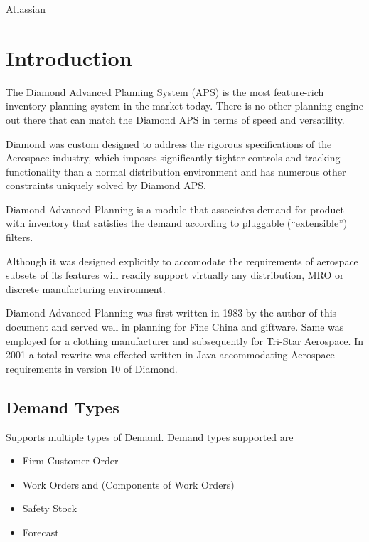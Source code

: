\documentclass[letterpaper,10pt,english]{sphinxmanual}
\begin{document}
\href{http://www.atlassian.com/}{Atlassian}


\chapter{Introduction}
\label{APS/Introduction:introduction}\label{APS/Introduction::doc}
The Diamond Advanced Planning System (APS) is the most feature-rich
inventory planning system in the market today. There is no other
planning engine out there that can match the Diamond APS in terms of
speed and versatility.

Diamond was custom designed to address the rigorous specifications of
the Aerospace industry, which imposes significantly tighter controls and
tracking functionality than a normal distribution environment and has numerous
other constraints uniquely solved by Diamond APS.

Diamond Advanced Planning is a module that associates demand for product
with inventory that satisfies the demand according to pluggable
(“extensible”) filters.

Although it was designed explicitly to accomodate the requirements of
aerospace subsets of its features will readily support virtually any
distribution, MRO or discrete manufacturing environment.

Diamond Advanced Planning was first written in 1983 by the author of
this document and served well in planning for Fine China and giftware.
Same was employed for a clothing manufacturer and subsequently for
Tri-Star Aerospace. In 2001 a total rewrite was effected written in Java
accommodating Aerospace requirements in version 10 of Diamond.


\section{Demand Types}
\label{APS/Introduction:demand-types}
Supports multiple types of Demand. Demand types supported are
\begin{itemize}
\item {} 
Firm Customer Order

\item {} 
Work Orders and (Components of Work Orders)

\item {} 
Safety Stock

\item {} 
Forecast

\end{itemize}
\end{document}
